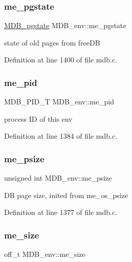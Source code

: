 \subsubsection{\texorpdfstring{me\+\_\+pgstate}{me\_pgstate}}
{\footnotesize\ttfamily \mbox{\hyperlink{struct_m_d_b__pgstate}{M\+D\+B\+\_\+pgstate}} M\+D\+B\+\_\+env\+::me\+\_\+pgstate}

state of old pages from free\+DB 

Definition at line 1400 of file mdb.\+c.

\mbox{\label{struct_m_d_b__env_a417b6c74fbbde9f6474358517c577a96}} 
\subsubsection{\texorpdfstring{me\+\_\+pid}{me\_pid}}
{\footnotesize\ttfamily M\+D\+B\+\_\+\+P\+I\+D\+\_\+T M\+D\+B\+\_\+env\+::me\+\_\+pid}

process ID of this env 

Definition at line 1384 of file mdb.\+c.

\mbox{\label{struct_m_d_b__env_afdddd82c8660afbdbe45fd7e5353ec53}} 
\subsubsection{\texorpdfstring{me\+\_\+psize}{me\_psize}}
{\footnotesize\ttfamily unsigned int M\+D\+B\+\_\+env\+::me\+\_\+psize}

DB page size, inited from me\+\_\+os\+\_\+psize 

Definition at line 1377 of file mdb.\+c.

\mbox{\label{struct_m_d_b__env_ad6d73a08b30a6c370cefb129ee2313d8}} 
\subsubsection{\texorpdfstring{me\+\_\+size}{me\_size}}
{\footnotesize\ttfamily off\+\_\+t M\+D\+B\+\_\+env\+::me\+\_\+size}

